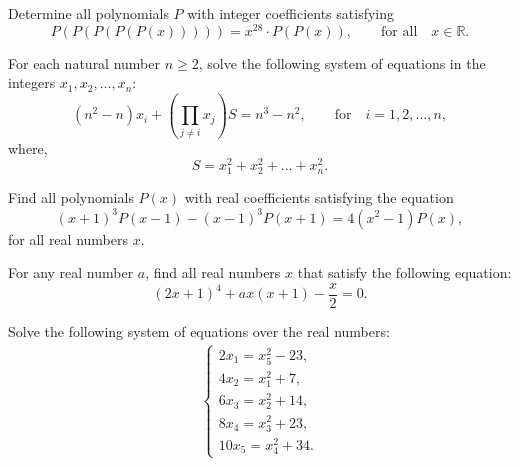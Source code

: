 \begin{question}[name={2005 Austrian--Polish}]
    Determine all polynomials $P$ with integer coefficients satisfying
    \[P(P(P(P(P(x)))))=x^{28}\cdot P(P(x)),\qquad \text{for all} \quad x\in\mathbb{R}.\]
\end{question}


\begin{question}[name={2005 Austrian--Polish}]
    For each natural number $n\geq 2$, solve the following system of equations in the integers $x_1, x_2, \dots, x_n$: $$(n^2-n)x_i+\left(\prod_{j\neq i}x_j\right)S=n^3-n^2,\qquad \text{for} \quad i=1,2,\dots, n,$$ where, $$S=x_1^2+x_2^2+\dots+x_n^2.$$
\end{question}

\begin{question}[name={2006 Austrian--Polish}]
    Find all polynomials $P(x)$ with real coefficients satisfying the equation \[(x+1)^{3}P(x-1)-(x-1)^{3}P(x+1)=4(x^{2}-1) P(x),\] for all real numbers $x$.
\end{question}



\begin{question}[name={2000 Austria}]
    For any real number $a$, find all real numbers $x$ that satisfy the following equation: $$(2x + 1)^4 + ax(x + 1) - \frac{x}{2}= 0.$$
\end{question}


\begin{question}[name={2002 Austria}]
    Solve the following system of equations over the real numbers:
    \begin{align*}
        \begin{cases}
            2x_1 = x_5 ^2 - 23,\\
            4x_2 = x_1 ^2 + 7,\\
            6x_3 = x_2 ^2 + 14,\\
            8x_4 = x_3 ^2 + 23,\\
            10x_5 = x_4 ^2 + 34.
        \end{cases}
    \end{align*}
\end{question}


